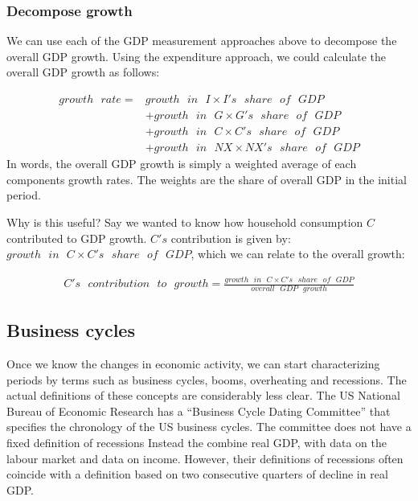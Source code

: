 \documentclass[]{book}
\begin{document}
\hypertarget{decompose-growth}{%
\subsubsection{Decompose growth}\label{decompose-growth}}

We can use each of the GDP measurement approaches above to decompose the overall GDP growth. Using the expenditure approach, we could calculate the overall GDP growth as follows:

\begin{align}
growth\text{ }rate=&growth\text{ }in\text{ }I\times I's\text{ }share\text{ }of\text{ }GDP\\
                   &+growth\text{ }in\text{ }G\times G's\text{ }share\text{ }of\text{ }GDP\\
                   &+growth\text{ }in\text{ }C\times C's\text{ }share\text{ }of\text{ }GDP\\
                   &+growth\text{ }in\text{ }NX\times NX's\text{ }share\text{ }of\text{ }GDP
\end{align}
In words, the overall GDP growth is simply a weighted average of each components growth rates. The weights are the share of overall GDP in the initial period.

Why is this useful? Say we wanted to know how household consumption \(C\) contributed to GDP growth. \(C's\) contribution is given by: \(growth\text{ }in\text{ }C\times C's\text{ }share\text{ }of\text{ }GDP\), which we can relate to the overall growth:

\begin{align}
C's\text{ }contribution\text{ }to\text{ }growth=\frac{growth\text{ }in\text{ }C\times C's\text{ }share\text{ }of\text{ }GDP}{overall\text{ }GDP\text{ }growth}
\end{align}

\hypertarget{business-cycles}{%
\subsection{Business cycles}\label{business-cycles}}

Once we know the changes in economic activity, we can start characterizing periods by terms such as business cycles, booms, overheating and recessions. The actual definitions of these concepts are considerably less clear. The US National Bureau of Economic Research has a ``Business Cycle Dating Committee'' that specifies the chronology of the US business cycles. The committee does not have a fixed definition of recessions Instead the combine real GDP, with data on the labour market and data on income. However, their definitions of recessions often coincide with a definition based on two consecutive quarters of decline in real GDP.
\end{document}
